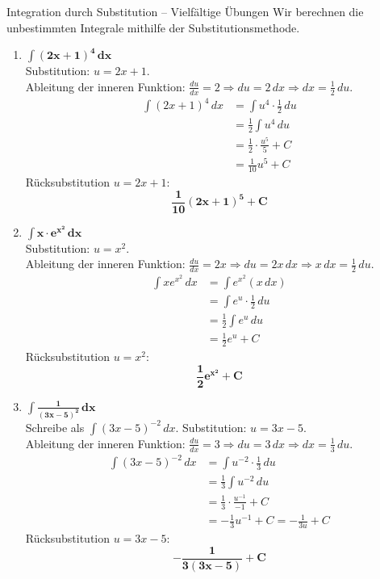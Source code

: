\begin{loesungsumgebung}{Integration durch Substitution – Vielfältige Übungen}
Wir berechnen die unbestimmten Integrale mithilfe der Substitutionsmethode.

\begin{enumerate}[label=(\alph*)]
    \item $\mathbf{\int (2x+1)^4 \,dx}$ \\
    Substitution: $u = 2x+1$. \\
    Ableitung der inneren Funktion: $\frac{du}{dx} = 2 \Rightarrow du = 2 \,dx \Rightarrow dx = \frac{1}{2} \,du$.
    \begin{align*} \int (2x+1)^4 \,dx &= \int u^4 \cdot \frac{1}{2} \,du \\ &= \frac{1}{2} \int u^4 \,du \\ &= \frac{1}{2} \cdot \frac{u^5}{5} + C \\ &= \frac{1}{10}u^5 + C \end{align*}
    Rücksubstitution $u=2x+1$:
    $$ \mathbf{\frac{1}{10}(2x+1)^5 + C} $$

    \item $\mathbf{\int x \cdot e^{x^2} \,dx}$ \\
    Substitution: $u = x^2$. \\
    Ableitung der inneren Funktion: $\frac{du}{dx} = 2x \Rightarrow du = 2x \,dx \Rightarrow x \,dx = \frac{1}{2} \,du$.
    \begin{align*} \int x e^{x^2} \,dx &= \int e^{x^2} (x \,dx) \\ &= \int e^u \cdot \frac{1}{2} \,du \\ &= \frac{1}{2} \int e^u \,du \\ &= \frac{1}{2} e^u + C \end{align*}
    Rücksubstitution $u=x^2$:
    $$ \mathbf{\frac{1}{2}e^{x^2} + C} $$

    \item $\mathbf{\int \frac{1}{(3x-5)^2} \,dx}$ \\
    Schreibe als $\int (3x-5)^{-2} \,dx$.
    Substitution: $u = 3x-5$. \\
    Ableitung der inneren Funktion: $\frac{du}{dx} = 3 \Rightarrow du = 3 \,dx \Rightarrow dx = \frac{1}{3} \,du$.
    \begin{align*} \int (3x-5)^{-2} \,dx &= \int u^{-2} \cdot \frac{1}{3} \,du \\ &= \frac{1}{3} \int u^{-2} \,du \\ &= \frac{1}{3} \cdot \frac{u^{-1}}{-1} + C \\ &= -\frac{1}{3}u^{-1} + C = -\frac{1}{3u} + C \end{align*}
    Rücksubstitution $u=3x-5$:
    $$ \mathbf{-\frac{1}{3(3x-5)} + C} $$


\end{enumerate}
\end{loesungsumgebung}
